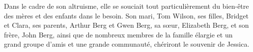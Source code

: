 {Dans le cadre de son altruisme, elle se souciait tout particulièrement du
bien-être des mères et des enfants dans le besoin. Son mari, Tom Wilson, ses
filles, Bridget et Clara, ses parents, Arthur Berg et Gwen Berg, sa sœur,
Elizabeth Berg, et son frère, John Berg, ainsi que de nombreux membres de la
famille élargie et un grand groupe d'amis et une grande communauté, chériront le
souvenir de Jessica.

}
